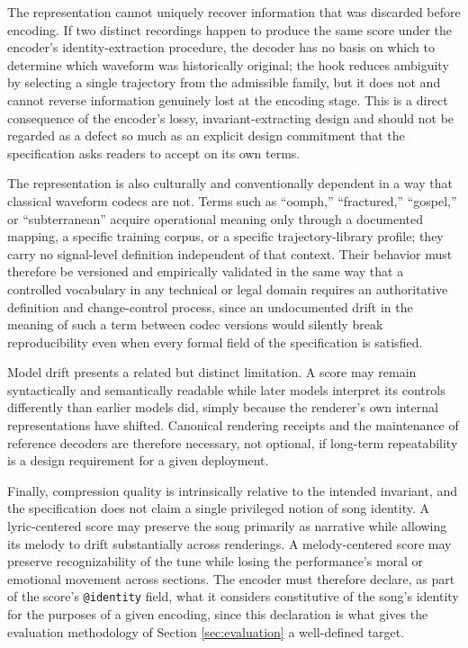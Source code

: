 \documentclass[11pt]{article}
\begin{document}
The representation cannot uniquely recover information that was discarded before encoding. If two distinct recordings happen to produce the same score under the encoder's identity-extraction procedure, the decoder has no basis on which to determine which waveform was historically original; the hook reduces ambiguity by selecting a single trajectory from the admissible family, but it does not and cannot reverse information genuinely lost at the encoding stage. This is a direct consequence of the encoder's lossy, invariant-extracting design and should not be regarded as a defect so much as an explicit design commitment that the specification asks readers to accept on its own terms.

The representation is also culturally and conventionally dependent in a way that classical waveform codecs are not. Terms such as ``oomph,'' ``fractured,'' ``gospel,'' or ``subterranean'' acquire operational meaning only through a documented mapping, a specific training corpus, or a specific trajectory-library profile; they carry no signal-level definition independent of that context. Their behavior must therefore be versioned and empirically validated in the same way that a controlled vocabulary in any technical or legal domain requires an authoritative definition and change-control process, since an undocumented drift in the meaning of such a term between codec versions would silently break reproducibility even when every formal field of the specification is satisfied.

Model drift presents a related but distinct limitation. A score may remain syntactically and semantically readable while later models interpret its controls differently than earlier models did, simply because the renderer's own internal representations have shifted. Canonical rendering receipts and the maintenance of reference decoders are therefore necessary, not optional, if long-term repeatability is a design requirement for a given deployment.

Finally, compression quality is intrinsically relative to the intended invariant, and the specification does not claim a single privileged notion of song identity. A lyric-centered score may preserve the song primarily as narrative while allowing its melody to drift substantially across renderings. A melody-centered score may preserve recognizability of the tune while losing the performance's moral or emotional movement across sections. The encoder must therefore declare, as part of the score's \texttt{@identity} field, what it considers constitutive of the song's identity for the purposes of a given encoding, since this declaration is what gives the evaluation methodology of Section \ref{sec:evaluation} a well-defined target.
\end{document}
